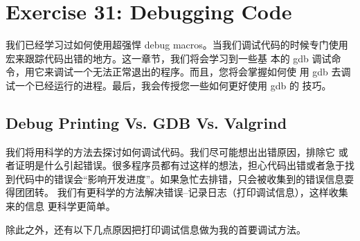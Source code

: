 \chapter{Exercise 31: Debugging Code}

我们已经学习过如何使用超强悍 debug macros。当我们调试代码的时候专门使用
宏来跟踪代码出错的地方。这一章节，我们将会学习到一些基
本的 gdb 调试命令，用它来调试一个无法正常退出的程序。而且，您将会掌握如何使
用 gdb 去调试一个已经运行的进程。最后，我会传授您一些如何更好使用 gdb 的
技巧。

\section{Debug Printing Vs. GDB Vs. Valgrind}

我们将用科学的方法去探讨如何调试代码。我们尽可能想出出错原因，排除它
或者证明是什么引起错误。很多程序员都有过这样的想法，担心代码出错或者急于找
到代码中的错误会“影响开发进度”。如果急忙去排错，只会被收集到的错误信息耍得团团转。
我们有更科学的方法解决错误--记录日志（打印调试信息），这样收集来的信息
更科学更简单。

除此之外，还有以下几点原因把打印调试信息做为我的首要调试方法。

